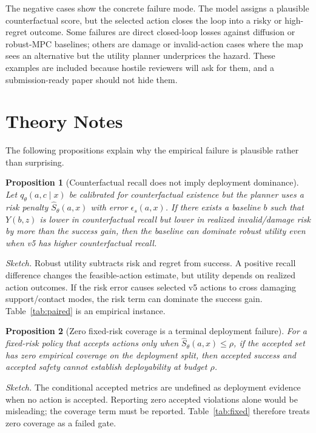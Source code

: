 \documentclass{article}
\newtheorem{proposition}{Proposition}
\begin{document}
The negative cases show the concrete failure mode. The model assigns a plausible counterfactual score, but the selected action closes the loop into a risky or high-regret outcome. Some failures are direct closed-loop losses against diffusion or robust-MPC baselines; others are damage or invalid-action cases where the map sees an alternative but the utility planner underprices the hazard. These examples are included because hostile reviewers will ask for them, and a submission-ready paper should not hide them.

\section{Theory Notes}
The following propositions explain why the empirical failure is plausible rather than surprising.

\begin{proposition}[Counterfactual recall does not imply deployment dominance]
Let $q_\theta(a,c\mid x)$ be calibrated for counterfactual existence but the planner uses a risk penalty $\widehat{S}_\theta(a,x)$ with error $\epsilon_s(a,x)$. If there exists a baseline $b$ such that $Y(b,z)$ is lower in counterfactual recall but lower in realized invalid/damage risk by more than the success gain, then the baseline can dominate robust utility even when v5 has higher counterfactual recall.
\end{proposition}

\noindent\textit{Sketch.} Robust utility subtracts risk and regret from success. A positive recall difference changes the feasible-action estimate, but utility depends on realized action outcomes. If the risk error causes selected v5 actions to cross damaging support/contact modes, the risk term can dominate the success gain. Table~\ref{tab:paired} is an empirical instance.

\begin{proposition}[Zero fixed-risk coverage is a terminal deployment failure]
For a fixed-risk policy that accepts actions only when $\widehat{S}_\theta(a,x)\leq \rho$, if the accepted set has zero empirical coverage on the deployment split, then accepted success and accepted safety cannot establish deployability at budget $\rho$.
\end{proposition}

\noindent\textit{Sketch.} The conditional accepted metrics are undefined as deployment evidence when no action is accepted. Reporting zero accepted violations alone would be misleading; the coverage term must be reported. Table~\ref{tab:fixed} therefore treats zero coverage as a failed gate.
\end{document}
